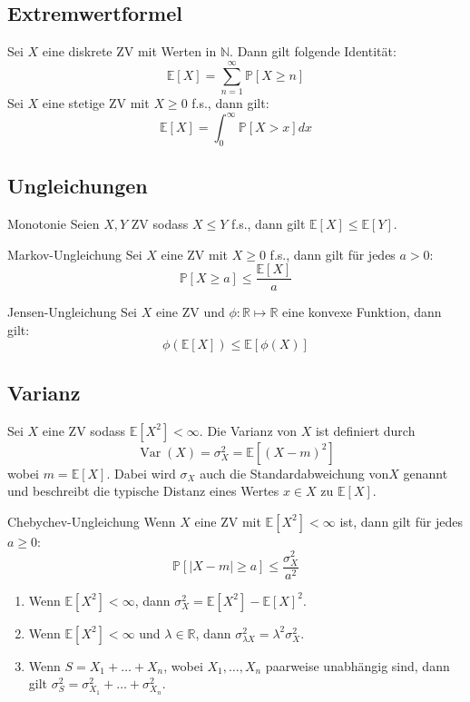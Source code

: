 \documentclass[a4paper,10pt]{article}
\def\R{\mathbb{R}}
\def\P{\mathbb{P}}
\def\E{\mathbb{E}}
\DeclareMathOperator{\Var}{\text{Var}}
\begin{document}
\subsection{Extremwertformel}
Sei \(X\) eine diskrete ZV mit Werten in \(\mathbb{N}\). Dann gilt folgende Identität:
\[\E[X] = \sum_{n=1}^\infty \P[X\ge n]\]
Sei \(X\) eine stetige ZV mit \(X \ge 0\) f.s., dann gilt:
\[\E[X] = \int_0^\infty \P[X > x] dx\]

\subsection{Ungleichungen}
\begin{subbox}{Monotonie}
    Seien \(X, Y\) ZV sodass \(X \le Y\) f.s., dann gilt \(\E[X] \le \E[Y]\).
\end{subbox}

\begin{mainbox}{Markov-Ungleichung}
    Sei \(X\) eine ZV mit \(X \ge 0\) f.s., dann gilt für jedes \(a > 0\):
    \[\P[X\ge a] \le \frac{\E[X]}{a}\]
\end{mainbox}

\begin{subbox}{Jensen-Ungleichung}
    Sei \(X\) eine ZV und \(\phi : \R \mapsto \R\) eine konvexe Funktion, dann gilt:
    \[\phi(\E[X]) \le \E[\phi(X)]\]
\end{subbox}

\subsection{Varianz}
Sei \(X\) eine ZV sodass \(\E[X^2] < \infty\). Die Varianz von \(X\) ist definiert durch
\[\Var(X) = \sigma_X^2 = \E[(X-m)^2]\]
wobei \(m=\E[X]\). Dabei wird \(\sigma_X\) auch die Standardabweichung von\(X\) genannt und beschreibt die typische Distanz eines Wertes \(x\in X\) zu \(\E[X]\).

\begin{subbox}{Chebychev-Ungleichung}
    Wenn \(X\) eine ZV mit \(\E[X^2] < \infty\) ist, dann gilt für jedes \(a \ge 0\):
    \[\P[|X - m| \ge a] \le \frac{\sigma_X^2}{a^2}\]
\end{subbox}

\begin{enumerate}
    \item Wenn \(\E[X^2] < \infty\), dann \(\sigma_X^2 = \E[X^2] - \E[X]^2\).
    \item Wenn \(\E[X^2] < \infty\) und \(\lambda \in \R\), dann \(\sigma_{\lambda X}^2 = \lambda^2\sigma_X^2\).
    \item Wenn \(S = X_1 + \ldots + X_n\), wobei \(X_1, \ldots, X_n\) paarweise unabhängig sind, dann gilt \(\sigma_S^2 = \sigma_{X_1}^2 + \ldots + \sigma_{X_n}^2\).
\end{enumerate}
\end{document}
